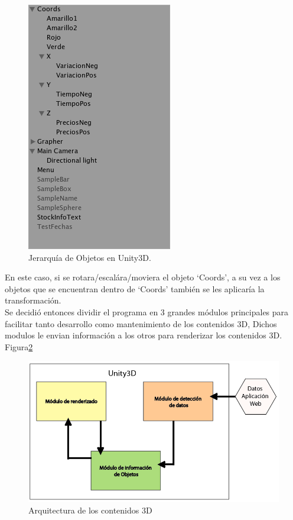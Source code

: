 \begin{figure}[h]
	\centering
		\includegraphics[scale=0.5]{parenting.png}
		\caption{Jerarquía de Objetos en Unity3D.}
	\label{fig:jerarq}
\end{figure}

En este caso, si se rotara/escalára/moviera el objeto `Coords', a su vez a los objetos que se encuentran dentro de `Coords' también se les aplicaría la transformación.\\

Se decidió entonces dividir el programa en 3 grandes módulos principales para facilitar tanto desarrollo como mantenimiento de los contenidos 3D, Dichos modulos le envian información a los otros para renderizar los contenidos 3D. Figura\ref{fig:modules}\\

\begin{figure}[h]
	\centering
		\includegraphics[scale=0.5]{ArquitecturaUnity.png}
		\caption{Arquitectura de los contenidos 3D}
	\label{fig:modules}
\end{figure}


